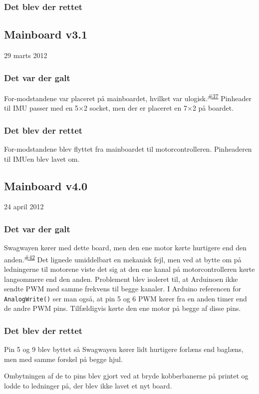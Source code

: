\documentclass[a4paper,oneside,article,danish,table]{memoir}
\newcommand{\boarddate}[1]{\textcolor{blue!80!black}{#1}}
\newcommand{\issue}[1]{\textsuperscript{\textcolor{blue!80!black}{\href{https://github.com/neic/Swagway/issues/#1}{\##1}}}}
\begin{document}
\subsubsection{Det blev der rettet}


\subsection{Mainboard v3.1}
\boarddate{29 marts 2012}
\subsubsection{Det var der galt}
For-modstandene var placeret på mainboardet, hvilket var ulogisk.\issue{37}
Pinheader til IMU passer med en 5×2 socket, men der er placeret en 7×2 på boardet.
\subsubsection{Det blev der rettet}
For-modstandene blev flyttet fra mainboardet til motorcontrolleren. Pinheaderen til IMUen blev lavet om.
\subsection{Mainboard v4.0}\label{sec:main40}
\boarddate{24 april 2012}
\subsubsection{Det var der galt}
Swagwayen kører med dette board, men den ene motor kørte hurtigere end den anden.\issue{42} Det lignede umiddelbart en mekanisk fejl, men ved at bytte om på ledningerne til motorene viste det sig at den ene kanal på motorcontrolleren kørte langsommere end den anden. 
Problement blev isoleret til, at Arduinoen ikke sendte PWM med samme frekvens til begge kanaler. I Arduino referencen for \texttt{AnalogWrite()} ser man også, at pin 5 og 6 PWM kører fra en anden timer end de andre PWM pins. Tilfældigvis kørte den ene motor på begge af disse pins. 

\subsubsection{Det blev der rettet}
Pin 5 og 9 blev byttet så Swagwayen kører lidt hurtigere forlæns end baglæns, men med samme forskel på begge hjul.

Ombytningen af de to pins blev gjort ved at bryde kobberbanerne på printet og lodde to ledninger på, der blev ikke lavet et nyt board.
\end{document}

